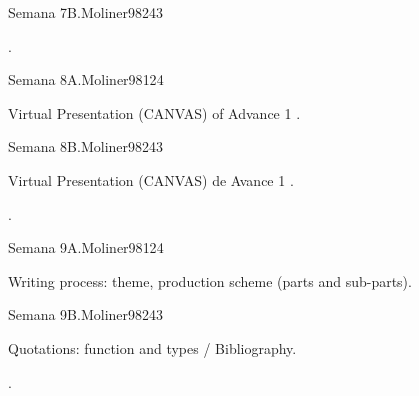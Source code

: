 \begin{syllabus}
\begin{unit}{}{Semana 7B.}{Moliner98}{24}{3}
   \begin{learningoutcomes}
      \item . 
      \end{learningoutcomes}
\end{unit}

\begin{unit}{}{Semana 8A.}{Moliner98}{12}{4}
   \begin{topics}
      \item Virtual Presentation (CANVAS) of Advance 1 .
   \end{topics}
   \begin{learningoutcomes}
      \item 
   \end{learningoutcomes}
\end{unit}

\begin{unit}{}{Semana 8B.}{Moliner98}{24}{3}
   \begin{topics}
      \item Virtual Presentation (CANVAS) de Avance 1 .
   \end{topics}

   \begin{learningoutcomes}
      \item .
      \end{learningoutcomes}
\end{unit}

\begin{unit}{}{Semana 9A.}{Moliner98}{12}{4}
   \begin{topics}
      \item Writing process: theme, production scheme (parts and sub-parts).
   \end{topics}
   \begin{learningoutcomes}
      \item 
   \end{learningoutcomes}
\end{unit}

\begin{unit}{}{Semana 9B.}{Moliner98}{24}{3}
   \begin{topics}
      \item Quotations: function and types / Bibliography.
   \end{topics}

   \begin{learningoutcomes}
      \item .
      \end{learningoutcomes}
\end{unit}



\end{syllabus}
